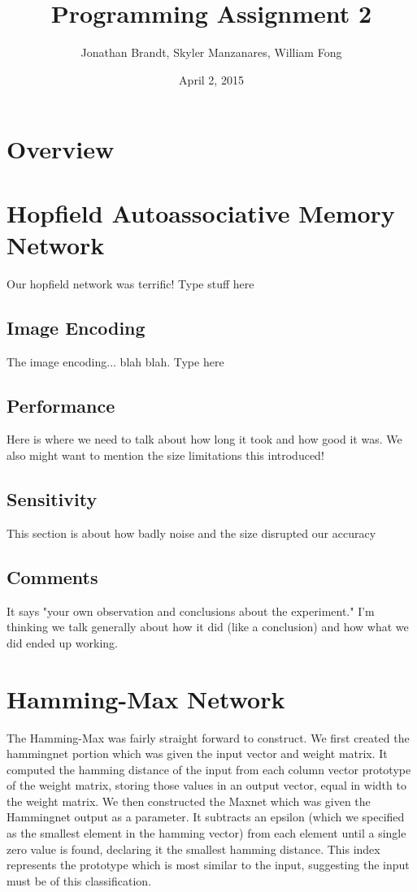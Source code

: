 \documentclass{article}
\begin{document}
\author{Jonathan Brandt, Skyler Manzanares, William Fong}
\date{April 2, 2015}
\title{Programming Assignment 2}

\maketitle

\section{Overview}

\section{Hopfield Autoassociative Memory Network}
Our hopfield network was terrific! Type stuff here

\subsection{Image Encoding}
The image encoding... blah blah. Type here

\subsection{Performance}
Here is where we need to talk about how long it took and how good it was. We
also might want to mention the size limitations this introduced!

\subsection{Sensitivity}
This section is about how badly noise and the size disrupted our accuracy

\subsection{Comments}
It says "your own observation and conclusions about the experiment."
I'm thinking we talk generally about how it did (like a conclusion) and how
what we did ended up working.





\section{Hamming-Max Network}
The Hamming-Max was fairly straight forward to construct.  We first created the hammingnet portion which was given the input vector and weight matrix.  It computed the hamming distance of the input from each column vector prototype of the weight matrix, storing those values in an output vector, equal in width to the weight matrix.  We then constructed the Maxnet which was given the Hammingnet output as a parameter.  It subtracts an epsilon (which we specified as the smallest element in the hamming vector) from each element until a single zero value is found, declaring it the smallest hamming distance.  This index represents the prototype which is most similar to the input, suggesting the input must be of this classification.
\end{document}
